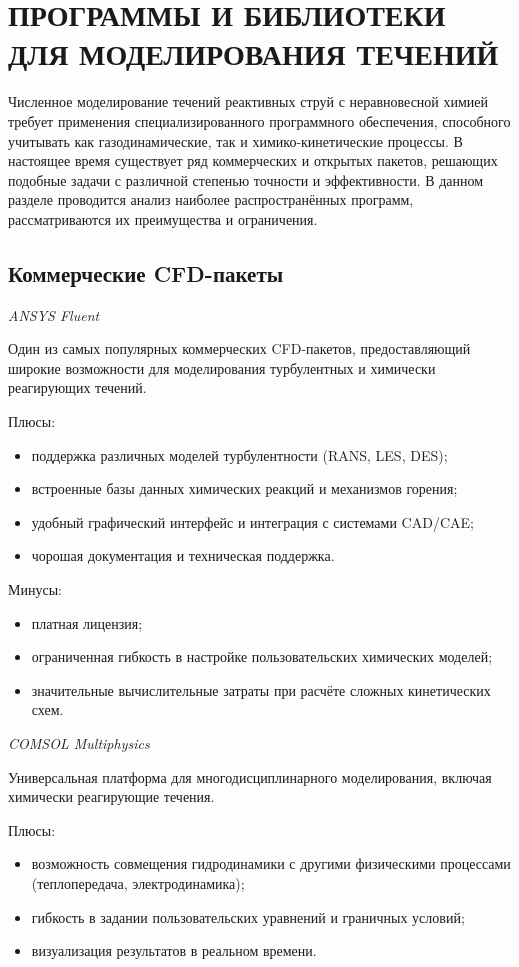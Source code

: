 \section{ПРОГРАММЫ И БИБЛИОТЕКИ ДЛЯ МОДЕЛИРОВАНИЯ ТЕЧЕНИЙ}

Численное моделирование течений реактивных струй с неравновесной химией требует применения специализированного программного обеспечения, способного учитывать как газодинамические, так и химико-кинетические процессы. В настоящее время существует ряд коммерческих и открытых пакетов, решающих подобные задачи с различной степенью точности и эффективности. В данном разделе проводится анализ наиболее распространённых программ, рассматриваются их преимущества и ограничения.

\subsection{Коммерческие CFD-пакеты}

\textit{ANSYS Fluent}

Один из самых популярных коммерческих CFD-пакетов, предоставляющий широкие возможности для моделирования турбулентных и химически реагирующих течений.

Плюсы:
\begin{itemize}
    \item поддержка различных моделей турбулентности (RANS, LES, DES);
    \item встроенные базы данных химических реакций и механизмов горения;
    \item удобный графический интерфейс и интеграция с системами CAD/CAE;
    \item чорошая документация и техническая поддержка.
\end{itemize}

Минусы:
\begin{itemize}
    \item платная лицензия;
    \item ограниченная гибкость в настройке пользовательских химических моделей;
    \item значительные вычислительные затраты при расчёте сложных кинетических схем.
\end{itemize}

\textit{COMSOL Multiphysics}

Универсальная платформа для многодисциплинарного моделирования, включая химически реагирующие течения.

Плюсы:
\begin{itemize}
    \item возможность совмещения гидродинамики с другими физическими процессами (теплопередача, электродинамика);
    \item гибкость в задании пользовательских уравнений и граничных условий;
    \item визуализация результатов в реальном времени.
\end{itemize}

